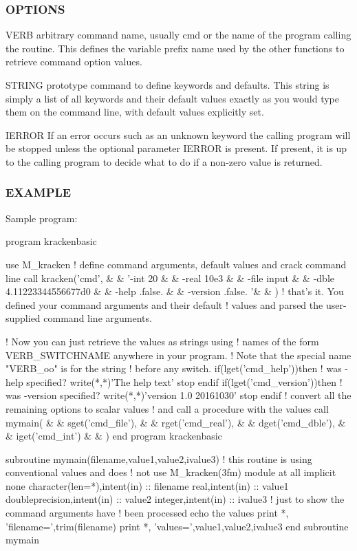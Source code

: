 \subsubsection*{O\+P\+T\+I\+O\+NS}

V\+E\+RB arbitrary command name, usually \textquotesingle{}cmd\textquotesingle{} or the name of the program calling the routine. This defines the variable prefix name used by the other functions to retrieve command option values.

S\+T\+R\+I\+NG prototype command to define keywords and defaults. This string is simply a list of all keywords and their default values exactly as you would type them on the command line, with default values explicitly set.

I\+E\+R\+R\+OR If an error occurs such as an unknown keyword the calling program will be stopped unless the optional parameter I\+E\+R\+R\+OR is present. If present, it is up to the calling program to decide what to do if a non-\/zero value is returned. \subsubsection*{E\+X\+A\+M\+P\+LE}

Sample program\+: \begin{DoxyVerb}program krackenbasic

use M_kracken
! define command arguments, default values and crack command line
call kracken('cmd',              &
   &   '-int 20                  &
   &   -real 10e3                &
   &   -file input               &
   &   -dble 4.11223344556677d0  &
   &   -help    .false.          &
   &   -version .false.         '&
   &   )
! that's it. You defined your command arguments and their default
! values and parsed the user-supplied command line arguments.

! Now you can just retrieve the values as strings using
! names of the form VERB_SWITCHNAME anywhere in your program.
! Note that the special name "VERB_oo"  is for the string
! before any switch.
   if(lget('cmd_help'))then ! was -help specified?
      write(*,*)'The help text'
      stop
   endif
   if(lget('cmd_version'))then ! was -version specified?
      write(*,*)'version 1.0 20161030'
      stop
   endif
   ! convert all the remaining options to scalar values
   ! and call a procedure with the values
   call mymain(                  &
   & sget('cmd_file'),           &
   & rget('cmd_real'),           &
   & dget('cmd_dble'),           &
   & iget('cmd_int')             &
   & )
end program krackenbasic

subroutine mymain(filename,value1,value2,ivalue3)
! this routine is using conventional values and does
! not use M_kracken(3fm) module at all
implicit none
character(len=*),intent(in) :: filename
real,intent(in)             :: value1
doubleprecision,intent(in)  :: value2
integer,intent(in)          :: ivalue3
   ! just to show the command arguments have
   ! been processed echo the values
   print *, 'filename=',trim(filename)
   print *, 'values=',value1,value2,ivalue3
end subroutine mymain
\end{DoxyVerb}


